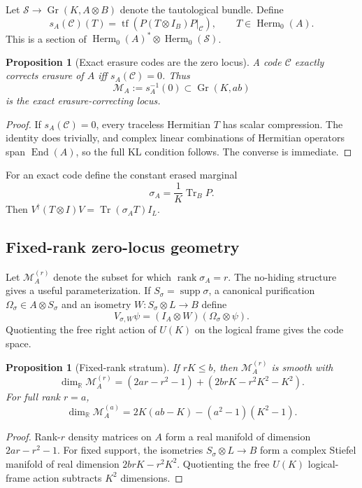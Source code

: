 \documentclass[11pt]{article}
\newtheorem{proposition}[theorem]{Proposition}
\theoremstyle{definition}
\newcommand{\cC}{\mathcal C}
\newcommand{\cM}{\mathcal M}
\newcommand{\cS}{\mathcal S}
\newcommand{\Gr}{\operatorname{Gr}}
\newcommand{\Herm}{\operatorname{Herm}}
\newcommand{\rank}{\operatorname{rank}}
\newcommand{\Tr}{\operatorname{Tr}}
\newcommand{\tf}{\operatorname{tf}}
\newcommand{\supp}{\operatorname{supp}}
\newcommand{\R}{\mathbb R}
\begin{document}
Let $\cS\to\Gr(K,A\otimes B)$ denote the tautological bundle. Define
\begin{equation}
s_A(\cC)(T)=\tf\!\left(P(T\otimes I_B)P\big|_{\cC}\right),\qquad T\in\Herm_0(A).
\label{eq:section}
\end{equation}
This is a section of $\Herm_0(A)^*\otimes\Herm_0(\cS)$.

\begin{proposition}[Exact erasure codes are the zero locus]
A code $\cC$ exactly corrects erasure of $A$ iff $s_A(\cC)=0$. Thus
\[
\cM_A:=s_A^{-1}(0)\subset\Gr(K,ab)
\]
is the exact erasure-correcting locus.
\end{proposition}
\begin{proof}
If $s_A(\cC)=0$, every traceless Hermitian $T$ has scalar compression. The identity does trivially, and complex linear combinations of Hermitian operators span $\operatorname{End}(A)$, so the full KL condition follows. The converse is immediate.
\end{proof}

For an exact code define the constant erased marginal
\begin{equation}
\sigma_A=\frac1K\Tr_B P.
\label{eq:sigma}
\end{equation}
Then $V^\dagger(T\otimes I)V=\Tr(\sigma_A T)I_L$.

\subsection{Fixed-rank zero-locus geometry}
Let $\cM_A^{(r)}$ denote the subset for which $\rank\sigma_A=r$. The no-hiding structure gives a useful parameterization. If $S_\sigma=\supp\sigma$, a canonical purification $\Omega_\sigma\in A\otimes S_\sigma$ and an isometry $W:S_\sigma\otimes L\to B$ define
\begin{equation}
V_{\sigma,W}\psi=(I_A\otimes W)(\Omega_\sigma\otimes\psi).
\label{eq:canonical}
\end{equation}
Quotienting the free right action of $U(K)$ on the logical frame gives the code space.

\begin{proposition}[Fixed-rank stratum]
If $rK\le b$, then $\cM_A^{(r)}$ is smooth with
\begin{equation}
\dim_{\R}\cM_A^{(r)}=(2ar-r^2-1)+(2brK-r^2K^2-K^2).
\label{eq:dimstratum}
\end{equation}
For full rank $r=a$,
\begin{equation}
\dim_{\R}\cM_A^{(a)}=2K(ab-K)-(a^2-1)(K^2-1).
\label{eq:dimfull}
\end{equation}
\end{proposition}
\begin{proof}
Rank-$r$ density matrices on $A$ form a real manifold of dimension $2ar-r^2-1$. For fixed support, the isometries $S_\sigma\otimes L\to B$ form a complex Stiefel manifold of real dimension $2brK-r^2K^2$. Quotienting the free $U(K)$ logical-frame action subtracts $K^2$ dimensions.
\end{proof}
\end{document}
